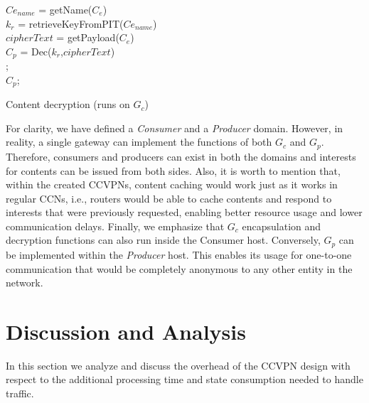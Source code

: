 \documentclass[conference,letterpaper,10pt]{IEEEtran}
\begin{document}
\begin{algorithm}[]\label{alg:contentDec}
$Ce_{name}$ = getName($C_e$)\\
$k_r$ = retrieveKeyFromPIT($Ce_{name}$)\\
$cipherText$ = getPayload($C_e$)\\
$C_p$ = Dec($k_r$,$cipherText$)\\
    {
    \Return ;\\
    }
    {\Return $C_p$;\\}
\caption{Content decryption (runs on $G_c$)}
\end{algorithm}

For clarity, we have defined a \textit{Consumer} and a \textit{Producer} domain. However, in reality, a single gateway can implement the functions of both $G_c$ and $G_p$. Therefore, consumers and producers can exist in both the domains and interests for contents can be issued from both sides. Also, it is worth to mention that, within the created CCVPNs, content caching would work just as it works in regular CCNs,  i.e., routers would be able to cache contents and respond to interests that were previously requested, enabling better resource usage and lower communication delays. Finally, we emphasize that $G_c$ encapsulation and decryption functions can also run inside the Consumer host. Conversely, $G_p$ can be implemented within the \textit{Producer} host. This enables its usage for one-to-one communication that would be completely anonymous to any  other entity in the network.  

\section{Discussion and Analysis}\label{sec:analysis}

In this section we analyze and discuss the overhead of the CCVPN design with respect 
to the additional processing time and state consumption needed to handle traffic. 
\end{document}
